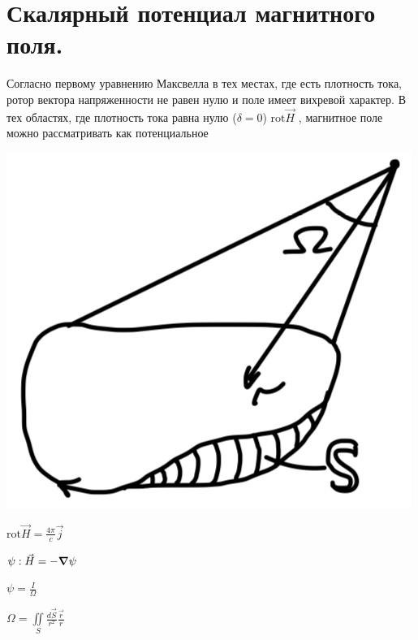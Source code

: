\section{Скалярный потенциал магнитного поля.}
 
Согласно первому уравнению Максвелла в тех местах, где есть плотность тока, ротор вектора напряженности не равен нулю и поле имеет вихревой характер. В тех областях, где плотность тока равна нулю ($\delta =0$) $\mathrm{rot}\vec{H}$  , магнитное поле можно рассматривать как потенциальное



\noindent
\begin{minipage}[c]{0.3\textwidth} %
    \includegraphics[width=\textwidth]{im/64.png}{} %
\end{minipage}%
\hfill
\begin{minipage}[c]{0.55\textwidth} %
    \( \mathrm{rot}\vec{H}=\frac{4\pi}{c}\vec{j}   \) 
    
    \( \psi: \vec{H}=-\grad \psi \)
    
    \( \psi = \frac{I}\Omega  \) 

    \( \Omega =\underset{S}{\iint}\frac{d\vec{S}}{r^2} \frac{\vec{r}}{r}   \) 
\end{minipage}
\[\text{ }\]
\noindent
